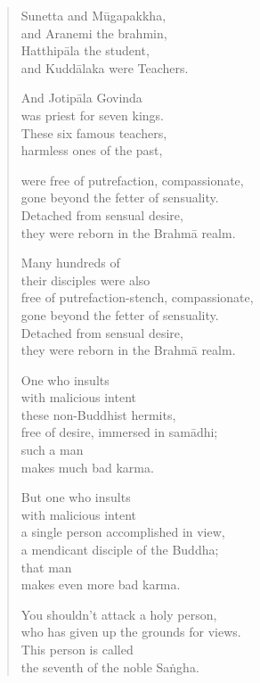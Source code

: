 \documentclass[12pt,openany]{book}%
\begin{document}
\begin{verse}%
Sunetta and \textsanskrit{Mūgapakkha}, \\
and Aranemi the brahmin, \\
\textsanskrit{Hatthipāla} the student, \\
and \textsanskrit{Kuddālaka} were Teachers. 

And \textsanskrit{Jotipāla} Govinda \\
was priest for seven kings. \\
These six famous teachers, \\
harmless ones of the past, 

were free of putrefaction, compassionate, \\
gone beyond the fetter of sensuality. \\
Detached from sensual desire, \\
they were reborn in the \textsanskrit{Brahmā} realm. 

Many hundreds of \\
their disciples were also \\
free of putrefaction-stench, compassionate, \\
gone beyond the fetter of sensuality. \\
Detached from sensual desire, \\
they were reborn in the \textsanskrit{Brahmā} realm. 

One who insults \\
with malicious intent \\
these non-Buddhist hermits, \\
free of desire, immersed in \textsanskrit{samādhi}; \\
such a man \\
makes much bad karma. 

But one who insults \\
with malicious intent \\
a single person accomplished in view, \\
a mendicant disciple of the Buddha; \\
that man \\
makes even more bad karma. 

You shouldn’t attack a holy person, \\
who has given up the grounds for views. \\
This person is called \\
the seventh of the noble \textsanskrit{Saṅgha}. 


\end{verse}
\end{document}
